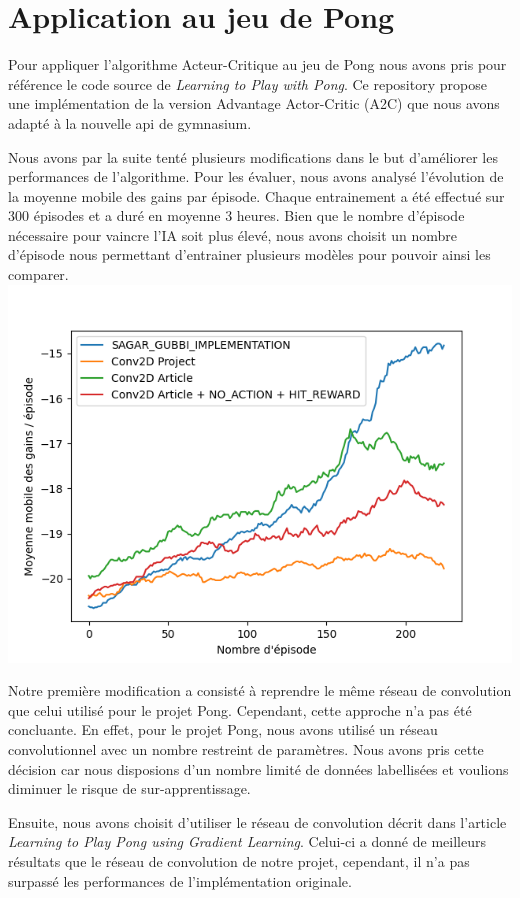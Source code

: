 \section{Application au jeu de Pong}

Pour appliquer l'algorithme Acteur-Critique au jeu de Pong nous avons pris pour référence le code source
de \emph{Learning to Play with Pong}\cite{PongGithub}. Ce repository propose une implémentation de la version Advantage Actor-Critic (A2C)
que nous avons adapté à la nouvelle api de gymnasium.

Nous avons par la suite tenté plusieurs modifications dans le but d'améliorer les performances de l'algorithme.
Pour les évaluer, nous avons analysé l'évolution de la moyenne mobile des gains par épisode.
Chaque entrainement a été effectué sur 300 épisodes et a duré en moyenne 3 heures. Bien que le nombre d'épisode nécessaire
pour vaincre l'IA soit plus élevé, nous avons choisit un nombre d'épisode nous permettant d'entrainer plusieurs modèles pour pouvoir ainsi les comparer.
\includegraphics[width=\linewidth]{rolling_average_graph.png}

\par Notre première modification a consisté à reprendre le même réseau de convolution que celui utilisé pour le projet Pong. 
Cependant, cette approche n'a pas été concluante. 
En effet, pour le projet Pong, nous avons utilisé un réseau convolutionnel avec un nombre restreint de 
paramètres. Nous avons pris cette décision car nous disposions d'un nombre limité de données labellisées 
et voulions diminuer le risque de sur-apprentissage. 

\par Ensuite, nous avons choisit d'utiliser le réseau de convolution 
décrit dans l'article \emph{Learning to Play Pong using Gradient Learning}\cite{PongPolicyGradient}.
Celui-ci a donné de meilleurs résultats que le réseau de convolution de notre projet, cependant, il n'a pas surpassé 
les performances de l'implémentation originale.

